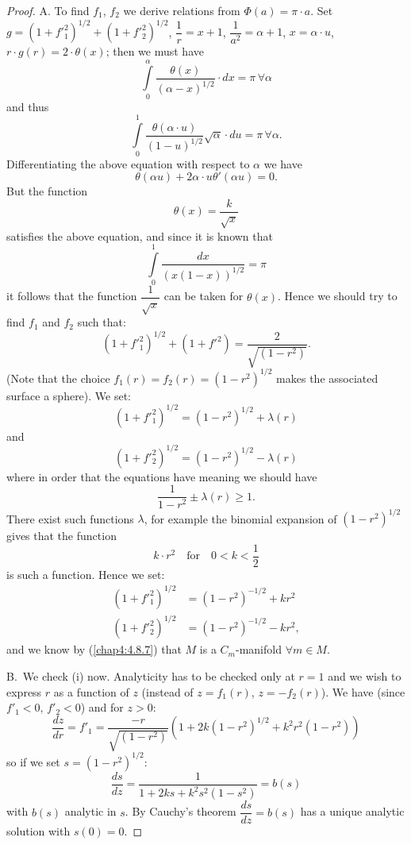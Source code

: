 \begin{proof}
A. To find $f_{1}$, $f_{2}$ we derive relations from
$\Phi(a)=\pi\cdot a$. Set
$g=(1+{f'}^{2}_{1})^{1/2}+(1+{f'}^{2}_{2})^{1/2}$, $\dfrac{1}{r}=x+1$,
$\dfrac{1}{a^{2}}=\alpha + 1$, $x=\alpha\cdot u$, $r\cdot
g(r)=2\cdot\theta(x)$; then we must have 
$$
\int\limits^{\alpha}_{0}\frac{\theta(x)}{(\alpha-x)^{1/2}}\cdot
dx=\pi \,\forall \alpha
$$
and thus
$$
\int\limits^{1}_{0}\frac{\theta(\alpha\cdot
  u)}{(1-u)^{1/2}}\sqrt{\alpha}\cdot du=\pi \, \forall \alpha.
$$
Differentiating the above equation with respect to $\alpha$ we have
\begin{equation*}
\theta(\alpha u)+2\alpha\cdot u\theta'(\alpha u)=0.\tag{4.8.9}\label{chap4:4.8.9}
\end{equation*}
But the function
$$
\theta(x)=\frac{k}{\sqrt{x}}
$$
satisfies the above equation, and since it is known that
$$
\int\limits^{1}_{0}\frac{dx}{(x(1-x))^{1/2}}=\pi
$$
it follows that the function $\dfrac{1}{\sqrt{x}}$ can be taken for
$\theta(x)$. Hence we should try to find $f_{1}$ and $f_{2}$ such
that:
$$
(1+{f'}^{2}_{1})^{1/2}+(1+{f'}^{2})=\frac{2}{\sqrt{(1-r^{2})}}.
$$
(Note that the choice $f_{1}(r)=f_{2}(r)=(1-r^{2})^{1/2}$ makes the
associated surface \pageoriginale a sphere). We set:
$$
(1+{f'}^{2}_{1})^{1/2}=(1-r^{2})^{1/2}+\lambda(r)
$$
and
$$
(1+{f'}^{2}_{2})^{1/2}=(1-r^{2})^{1/2}-\lambda(r)
$$
where in order that the equations have meaning we should have
$$
\frac{1}{1-r^{2}}\pm \lambda(r)\geq 1.
$$
There exist such functions $\lambda$, for example the binomial
expansion of $(1-r^{2})^{1/2}$ gives that the function
$$
k\cdot r^{2}\quad\text{for}\quad 0<k<\frac{1}{2}
$$
is such a function. Hence we set:
\begin{align*}
(1+{f'}^{2}_{1})^{1/2} &= (1-r^{2})^{-1/2}+kr^{2}\\
(1+{f'}^{2}_{2})^{1/2} &= (1-r^{2})^{-1/2}-kr^{2},
\end{align*}
and we know by (\ref{chap4:4.8.7}) that $M$ is a $C_{m}$-manifold
$\forall m\in M$.

B.~We check (i) now. Analyticity has to be checked only at $r=1$ and
we wish to express $r$ as a function of $z$ (instead of $z=f_{1}(r)$,
$z=-f_{2}(r)$). We have (since $f'_{1}<0$, $f'_{2}<0$) and for $z>0$:
$$
\frac{dz}{dr}=f'_{1}=\frac{-r}{\sqrt{(1-r^{2})}}(1+2k(1-r^{2})^{1/2}+k^{2}r^{2}(1-r^{2})) 
$$
so if we set $s=(1-r^{2})^{1/2}$:
$$
\frac{ds}{dz}=\frac{1}{1+2ks+k^{2}s^{2}(1-s^{2})}=b(s)
$$\pageoriginale
with $b(s)$ analytic in $s$. By Cauchy's theorem $\dfrac{ds}{dz}=b(s)$
has a unique analytic solution with $s(0)=0$.


\end{proof}
